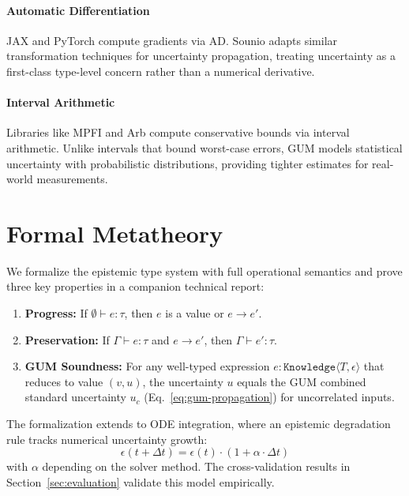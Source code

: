 \documentclass[11pt,a4paper]{article}
\begin{document}
\paragraph{Automatic Differentiation}
JAX \citep{bradbury2018jax} and PyTorch \citep{paszke2019pytorch} compute
gradients via AD. Sounio adapts similar transformation techniques for
uncertainty propagation, treating uncertainty as a first-class type-level
concern rather than a numerical derivative.

\paragraph{Interval Arithmetic}
Libraries like MPFI and Arb compute conservative bounds via interval
arithmetic. Unlike intervals that bound worst-case errors, GUM models
statistical uncertainty with probabilistic distributions, providing
tighter estimates for real-world measurements.

\section{Formal Metatheory}
\label{sec:formalization-ref}

We formalize the epistemic type system with full operational semantics and
prove three key properties in a companion technical report:

\begin{enumerate}
  \item \textbf{Progress:} If $\emptyset \vdash e : \tau$, then $e$ is a
        value or $e \longrightarrow e'$.
  \item \textbf{Preservation:} If $\Gamma \vdash e : \tau$ and
        $e \longrightarrow e'$, then $\Gamma \vdash e' : \tau$.
  \item \textbf{GUM Soundness:} For any well-typed expression
        $e : \texttt{Knowledge}\langle T, \epsilon \rangle$ that reduces to
        value $(v, u)$, the uncertainty $u$ equals the GUM combined standard
        uncertainty $u_c$ (Eq.~\ref{eq:gum-propagation}) for uncorrelated inputs.
\end{enumerate}

The formalization extends to ODE integration, where an epistemic degradation
rule tracks numerical uncertainty growth:
\[
  \epsilon(t + \Delta t) = \epsilon(t) \cdot (1 + \alpha \cdot \Delta t)
\]
with $\alpha$ depending on the solver method. The cross-validation results in
Section~\ref{sec:evaluation} validate this model empirically.
\end{document}
